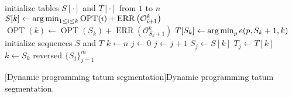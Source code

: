 \begin{algorithm}[ht!]
    \begin{algorithmic}[1]
        \State initialize tables $S[\cdot]$ and $T[\cdot]$ from $1$ to $n$
            \State $S[k]\gets \argmin_{1\leq i \leq k}\operatorname{OPT}(i)+\operatorname{ERR}\left(\mathcal{O}_{i+1}^k\right)$
            \State $\operatorname{OPT}(k)\gets \operatorname{OPT}(S_k)+\operatorname{ERR}\left(\mathcal{O}_{S_k+1}^k\right)$
            \State $T[S_k]\gets\argmin_p e(p,S_k+1,k)$
        \EndFor
        \State initialize sequences $S$ and $T$
        \State $k \gets n$
        \State $j \gets 0$
            \State $j \gets j + 1$
            \State $S_j \gets S[k]$
            \State $T_j \gets T[k]$
            \State $k \gets S_k$ 
        \EndWhile
        \State \Return reversed $\{S_j\}_{j=1}^m$
    \end{algorithmic}
    [Dynamic programming tatum segmentation]{Dynamic programming tatum segmentation.}
\end{algorithm}